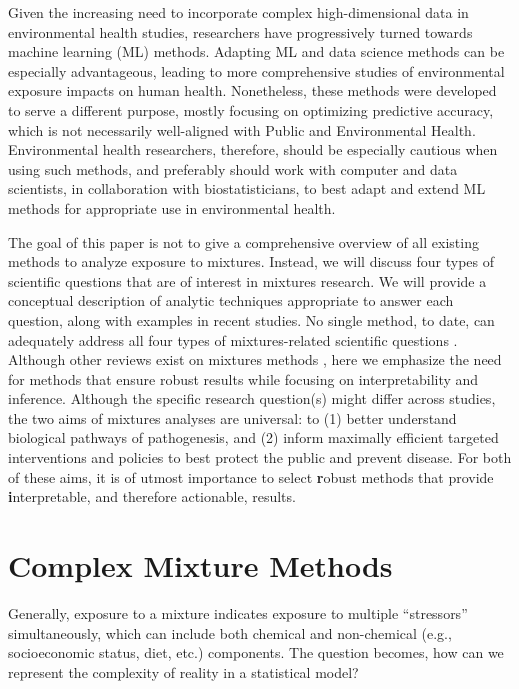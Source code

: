 Given the increasing need to incorporate complex high-dimensional data in environmental health studies, researchers have progressively turned towards machine learning (ML) methods. Adapting ML and data science methods can be especially advantageous, leading to more comprehensive studies of environmental exposure impacts on human health. Nonetheless, these methods were developed to serve a different purpose, mostly focusing on optimizing predictive accuracy, which is not necessarily well-aligned with Public and Environmental Health. Environmental health researchers, therefore, should be especially cautious when using such methods, and preferably should work with computer and data scientists, in collaboration with biostatisticians, to best adapt and extend ML methods for appropriate use in environmental health. 

The goal of this paper is not to give a comprehensive overview of all existing methods to analyze exposure to mixtures. Instead, we will discuss four types of scientific questions that are of interest in mixtures research. We will provide a conceptual description of analytic techniques appropriate to answer each question, along with examples in recent studies. No single method, to date, can adequately address all four types of mixtures-related scientific questions \citep{taylor16}. Although other reviews exist on mixtures methods \citep{hamra2018environmental, stafoggia2017statistical, huang2018cumulative, coker2018multi}, here we emphasize the need for methods that ensure robust results while focusing on interpretability and inference. Although the specific research question(s) might differ across studies, the two aims of mixtures analyses are universal: to (1) better understand biological pathways of pathogenesis, and (2) inform maximally efficient targeted interventions and policies to best protect the public and prevent disease. For both of these aims, it is of utmost importance to select {\textbf robust} methods that provide {\textbf interpretable}, and therefore actionable, results.

\section{Complex Mixture Methods}\label{sec:Methods}

Generally, exposure to a mixture indicates exposure to multiple ``stressors'' simultaneously, which can include both chemical and non-chemical (e.g., socioeconomic status, diet, etc.) components. The question becomes, how can we represent the complexity of reality in a statistical model? 

